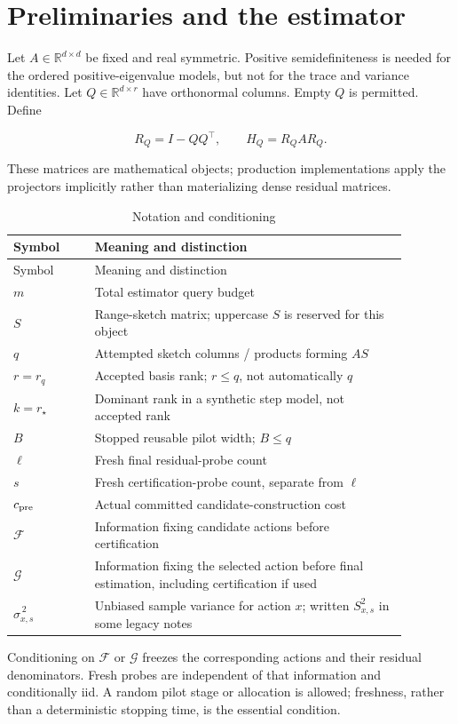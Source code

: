 \section{Preliminaries and the estimator}\label{sec:preliminaries}
Let $A\in\mathbb R^{d\times d}$ be fixed and real symmetric. Positive semidefiniteness is needed for the ordered positive-eigenvalue models, but not for the trace and variance identities. Let $Q\in\mathbb R^{d\times r}$ have orthonormal columns. Empty $Q$ is permitted. Define


\begin{equation}
R_Q=I-QQ^\top,\qquad H_Q=R_QAR_Q.
\end{equation}


These matrices are mathematical objects; production implementations apply the projectors implicitly rather than materializing dense residual matrices.


{\small
\begin{longtable}{@{}>{\raggedright\arraybackslash}p{0.1848\linewidth}>{\raggedright\arraybackslash}p{0.6952\linewidth}@{}}
\caption{Notation and conditioning}\label{tab:auto1}\\
\toprule
Symbol & Meaning and distinction \\
\midrule
\endfirsthead
\toprule
Symbol & Meaning and distinction \\
\midrule
\endhead
$m$ & Total estimator query budget \\
$S$ & Range-sketch matrix; uppercase $S$ is reserved for this object \\
$q$ & Attempted sketch columns / products forming $AS$ \\
$r=r_q$ & Accepted basis rank; $r\le q$, not automatically $q$ \\
$k=r_\star$ & Dominant rank in a synthetic step model, not accepted rank \\
$B$ & Stopped reusable pilot width; $B\le q$ \\
$\ell$ & Fresh final residual-probe count \\
$s$ & Fresh certification-probe count, separate from $\ell$ \\
$c_{\rm pre}$ & Actual committed candidate-construction cost \\
$\mathcal F$ & Information fixing candidate actions before certification \\
$\mathcal G$ & Information fixing the selected action before final estimation, including certification if used \\
$\widehat\sigma_{x,s}^{\,2}$ & Unbiased sample variance for action $x$; written $S_{x,s}^2$ in some legacy notes \\
\bottomrule
\end{longtable}
}
Conditioning on $\mathcal F$ or $\mathcal G$ freezes the corresponding actions and their residual denominators. Fresh probes are independent of that information and conditionally iid. A random pilot stage or allocation is allowed; freshness, rather than a deterministic stopping time, is the essential condition.

